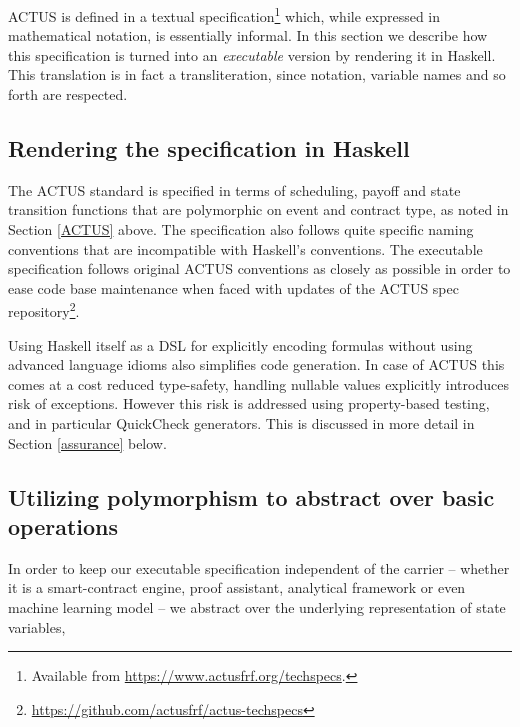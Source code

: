 \documentclass[runningheads]{llncs}
\begin{document}
ACTUS is defined in a textual specification\footnote{Available from \url{https://www.actusfrf.org/techspecs}.} which, while expressed in mathematical notation, is essentially informal. In this section we describe how this specification is turned into an \emph{executable} version by rendering it in Haskell. This translation is in fact a transliteration, since notation, variable names and so forth are respected.

\subsection{Rendering the specification in Haskell}

The ACTUS standard is specified in terms of scheduling, payoff and
state transition functions that are polymorphic on event and contract
type, as noted in Section \ref{ACTUS} above. The specification also follows quite specific naming conventions
that are incompatible with Haskell's conventions. The executable specification
follows original ACTUS conventions as closely as possible in order to
ease code base maintenance when faced with updates of the ACTUS
spec repository\footnote{\url{https://github.com/actusfrf/actus-techspecs}}.

Using Haskell itself as a DSL for explicitly encoding formulas without
using advanced language idioms also simplifies code generation. 
In case of ACTUS this comes at a cost reduced type-safety, handling nullable
values explicitly introduces risk of exceptions. However this risk
is addressed using property-based testing, and in particular QuickCheck generators. This is discussed in more detail in Section \ref{assurance} below.

\subsection{Utilizing polymorphism to abstract over basic operations}

In order to keep our executable specification independent of the carrier -- whether it is a smart-contract engine, proof assistant, analytical framework
or even machine learning model -- we abstract over the underlying representation
of state variables,
\end{document}
